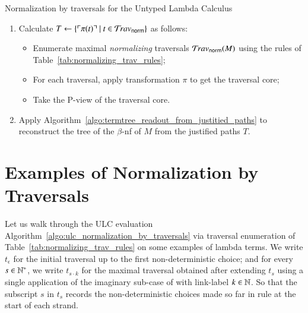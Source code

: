 \documentclass{elsarticle}
\theoremstyle{plain}
\theoremstyle{definition}
\newcommand{\normalizing}{{\sf norm}}
\newcommand{\travsetnorm}{\travset_\normalizing}
\def\coresymbol{\pi} %
\newcommand{\core}[1]{\coresymbol(#1)} %
\begin{document}
\begin{algorithm}%
\begin{algorithmic}
\caption{Normalization by traversals for the Untyped Lambda Calculus}
\label{algo:ulc_normalization_by_traversals}
\begin{enumerate}[nosep]
  \item Calculate $T \leftarrow \{ \pview{\core{t}} \ | \ t \in \travsetnorm \}$ as follows:
  \begin{itemize}[leftmargin=0.5em,nosep]
    \item Enumerate maximal \emph{normalizing} traversals $\travsetnorm(M)$ using the rules of Table~\ref{tab:normalizing_trav_rules};
    \item For each traversal, apply transformation $\coresymbol$ to get the traversal core;
    \item Take the P-view of the traversal core.
  \end{itemize}
  \item Apply Algorithm~\ref{algo:termtree_readout_from_justitied_paths} to reconstruct the tree of the $\beta$-nf of $M$ from the justified paths  $T$.
\end{enumerate}
\end{algorithmic}
\end{algorithm}

\section{Examples of Normalization by Traversals}
\label{sec:examples}
Let us walk through the ULC evaluation Algorithm~\ref{algo:ulc_normalization_by_traversals} via traversal enumeration of Table~\ref{tab:normalizing_trav_rules} on some examples of lambda terms. We write $t_\epsilon$  for the initial traversal up to the first non-deterministic choice; and for every $s \in \mathbb{N}^*$, we write $t_{s \cdot k}$ for the maximal traversal obtained after extending $t_s$ using a single application of the imaginary sub-case of  with link-label $k \in \mathbb{N}$. So that the subscript $s$ in $t_s$ records the non-deterministic choices made so far in rule 
at the start of each strand.
\end{document}
